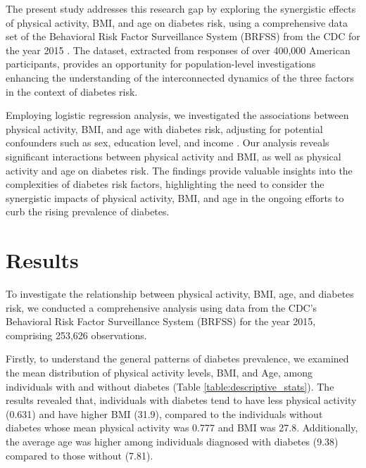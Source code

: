 \documentclass[11pt]{article}
\begin{document}
The present study addresses this research gap by exploring the synergistic effects of physical activity, BMI, and age on diabetes risk, using a comprehensive data set of the Behavioral Risk Factor Surveillance System (BRFSS) from the CDC for the year 2015 \cite{Yore2007ReliabilityAV}. The dataset, extracted from responses of over 400,000 American participants, provides an opportunity for population-level investigations enhancing the understanding of the interconnected dynamics of the three factors in the context of diabetes risk.

Employing logistic regression analysis, we investigated the associations between physical activity, BMI, and age with diabetes risk, adjusting for potential confounders such as sex, education level, and income \cite{Aekplakorn2018PrevalenceOD, Umpierre2011PhysicalAA}. Our analysis reveals significant interactions between physical activity and BMI, as well as physical activity and age on diabetes risk. The findings provide valuable insights into the complexities of diabetes risk factors, highlighting the need to consider the synergistic impacts of physical activity, BMI, and age in the ongoing efforts to curb the rising prevalence of diabetes.

\section*{Results}

To investigate the relationship between physical activity, BMI, age, and diabetes risk, we conducted a comprehensive analysis using data from the CDC's Behavioral Risk Factor Surveillance System (BRFSS) for the year 2015, comprising 253,626 observations.

Firstly, to understand the general patterns of diabetes prevalence, we examined the mean distribution of physical activity levels, BMI, and Age, among individuals with and without diabetes (Table \ref{table:descriptive_stats}). The results revealed that, individuals with diabetes tend to have less physical activity (0.631) and have higher BMI (31.9), compared to the individuals without diabetes whose mean physical activity was 0.777 and BMI was 27.8. Additionally, the average age was higher among individuals diagnosed with diabetes (9.38) compared to those without (7.81).
\end{document}
